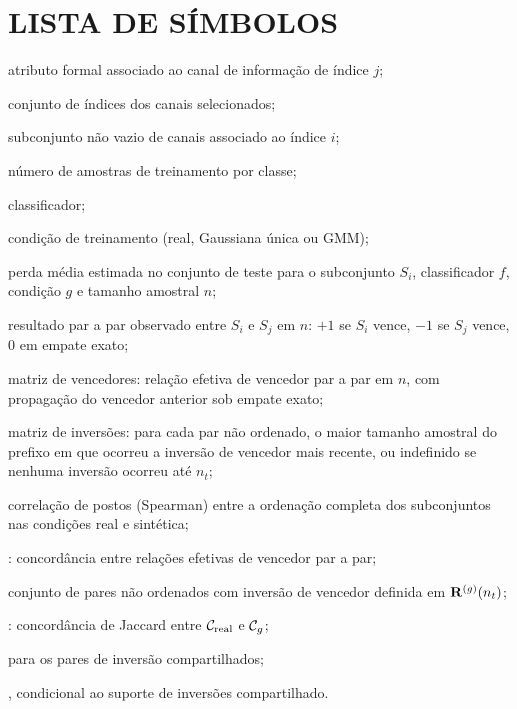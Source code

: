 \clearpage
{}
\listoffigures*
{}

\clearpage
{}
\listoftables*
{}

\clearpage
{}
\chapter*{LISTA DE SÍMBOLOS}
\begin{description}[style=multiline,leftmargin=3.2cm,labelwidth=2.6cm]
  \item[$X_j$] atributo formal associado ao canal de informação de índice $j$;
  \item[$I$] conjunto de índices dos canais selecionados;
  \item[$S_i$] subconjunto não vazio de canais associado ao índice $i$;
  \item[$n$] número de amostras de treinamento por classe;
  \item[$f$] classificador;
  \item[$g$] condição de treinamento (real, Gaussiana única ou GMM);
  \item[$\widehat{L}_{S_i,f}^{(g)}(n)$] perda média estimada no conjunto de teste para o subconjunto $S_i$, classificador $f$, condição $g$ e tamanho amostral $n$;
  \item[$U_{ij}(n)$] resultado par a par observado entre $S_i$ e $S_j$ em $n$: $+1$ se $S_i$ vence, $-1$ se $S_j$ vence, $0$ em empate exato;
  \item[$\Wmat(n)$] matriz de vencedores: relação efetiva de vencedor par a par em $n$, com propagação do vencedor anterior sob empate exato;
  \item[$\Rmat(n_t)$] matriz de inversões: para cada par não ordenado, o maior tamanho amostral do prefixo em que ocorreu a inversão de vencedor mais recente, ou indefinido se nenhuma inversão ocorreu até $n_t$;
  \item[$\rankrho$] correlação de postos (Spearman) entre a ordenação completa dos subconjuntos nas condições real e sintética;
  \item[$\AW$] \WinnersAgreement: concordância entre relações efetivas de vencedor par a par;
  \item[$\ReversalSupport_g(n_t)$] conjunto de pares não ordenados com inversão de vencedor definida em $\mathbf{R}^{(g)}(n_t)$;
  \item[$\AR$] \ReversalExistenceAgreement: concordância de Jaccard entre $\mathcal{C}_{\mathrm{real}}$ e $\mathcal{C}_{g}$;
  \item[$\DR$] \MeanLogReversalDistance{} para os pares de inversão compartilhados;
  \item[$\SR$] \ReversalSampleSizeSimilarity, condicional ao suporte de inversões compartilhado.
\end{description}

\clearpage
{}
\tableofcontents*
